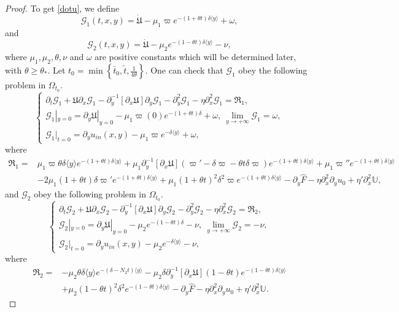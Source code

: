 \documentclass{amsart}
\numberwithin{equation}{section}
\newcommand\y{{{\langle y \rangle}}}
\begin{document}
\begin{proof}
To get \eqref{dotu}, we define
$$\mathcal{G}_{1}(t,x,y)=\dot{\mathfrak{U}}-\mu_{1}\varpi e^{-(1+\theta t)\delta\y}+\omega,$$
and
$$\mathcal{G}_{2}(t,x,y)=\dot{\mathfrak{U}}-\mu_{2}e^{-(1-\theta t)\delta\y}-\nu,$$
where $\mu_{1},\mu_{2},\theta,\nu$ and $\omega$ are positive constants which will be determined later, with $\theta\geq\theta_{*}$.
Let $t_{0}=\min\left\{\bar{t}_{0},\tilde{t},\frac{1}{4\theta}\right\}$.
One can check that $\mathcal{G}_{1}$ obey the following problem in $\Omega_{t_{0}}$.
\begin{equation}\label{pdotuge}
\begin{cases}
\partial_{t}\mathcal{G}_{1}
+\mathfrak{U}\partial_{x}\mathcal{G}_{1}
-\partial_{y}^{-1}[\partial_{x}\mathfrak{U}]\partial_{y}\mathcal{G}_{1}
-\partial_{y}^{2}\mathcal{G}_{1}
-\eta\partial_{x}^{2}\mathcal{G}_{1}
=\mathfrak{R}_{1},\\
\mathcal{G}_{1}|_{y=0}=\partial_{y}\mathfrak{U}|_{y=0}-\mu_{1}\varpi(0)e^{-(1+\theta t)\delta}+\omega,~
\lim\limits_{y\to+\infty}\mathcal{G}_{1}=\omega,\\
\mathcal{G}_{1}|_{t=0}=\partial_{y}u_{in}(x,y)-\mu_{1}\varpi e^{-\delta\y}+\omega,
\end{cases}
\end{equation}
where
\begin{align*}
\mathfrak{R}_{1}
=& \mu_{1}\varpi \theta\delta\y e^{-(1+\theta t)\delta\y}
  +\mu_{1}\partial_{y}^{-1}[\partial_{x}\mathfrak{U}]\left(\varpi'-\delta\varpi-\theta t\delta\varpi\right)e^{-(1+\theta t)\delta\y}
  +\mu_{1}\varpi''e^{-(1+\theta t)\delta\y}\\
 &-2\mu_{1}(1+\theta t)\delta\varpi'e^{-(1+\theta t)\delta\y}
  +\mu_{1}(1+\theta t)^{2}\delta^{2}\varpi e^{-(1+\theta t)\delta\y}
  -\partial_{y}\hat{F}
  -\eta\partial_{x}^{2}\partial_{y}u_{0}
  +\eta'\partial_{x}^{2}\mathbb{U},
\end{align*}
and $\mathcal{G}_{2}$ obey the following problem in $\Omega_{t_{0}}$.
\begin{equation}\label{pdotule}
\begin{cases}
\partial_{t}\mathcal{G}_{2}
+\mathfrak{U}\partial_{x}\mathcal{G}_{2}
-\partial_{y}^{-1}[\partial_{x}\mathfrak{U}]\partial_{y}\mathcal{G}_{2}
-\partial_{y}^{2}\mathcal{G}_{2}
-\eta\partial_{x}^{2}\mathcal{G}_{2}
=\mathfrak{R}_{2},\\
\mathcal{G}_{2}|_{y=0}=\partial_{y}\mathfrak{U}|_{y=0}-\mu_{2}e^{-(1-\theta t)\delta}-\nu,~
\lim\limits_{y\to+\infty}\mathcal{G}_{2}=-\nu,\\
\mathcal{G}_{2}|_{t=0}=\partial_{y}u_{in}(x,y)-\mu_{2}e^{-\delta\y}-\nu,
\end{cases}
\end{equation}
where
\begin{align*}
\mathfrak{R}_{2}
=&-\mu_{2}\theta\delta\y e^{-(\delta-N_{2}t)\y}
  -\mu_{2}\delta\partial_{y}^{-1}[\partial_{x}\mathfrak{U}]\left(1-\theta t\right) e^{-(1-\theta t)\delta\y}\\
 &+\mu_{2}(1-\theta t)^{2}\delta^{2}e^{-(1-\theta t)\delta\y}
  -\partial_{y}\hat{F}
  -\eta\partial_{x}^{2}\partial_{y}u_{0}
  +\eta'\partial_{x}^{2}\mathbb{U}.
\end{align*}


\end{proof}
\end{document}
